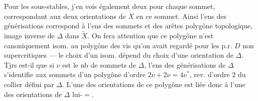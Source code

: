 Pour les sous-stables, j'en vois également deux pour chaque sommet, correspondant aux deux orientations de $X$ en ce sommet. Ainsi l'ens des  générisations correspond à l'ens des sommets et des arêtes  polygône topologique, image inverse de $\Delta$ dans $\widetilde X$. On fera attention que ce polygône n'est  canoniquement isom. au polygône des vis qu'on avait regardé pour les p.r. $D$ non supercritiques --- le choix d'un isom. dépend du choix d'une orientation de $\Delta$. Tjrs est-il que si $\nu$ est le nb de sommets de $\Delta$, l'ens des générisations  de $\Delta$ s'identifie aux sommets d'un  polygône  d'ordre \uline{$2\nu+2\nu=4\nu$}$^*$, rev. d'ordre $2$ du collier défini par $\Delta$. L'une des orientations de ce polygône est liée donc à l'une des orientations de $\Delta$ lui-$=$.


